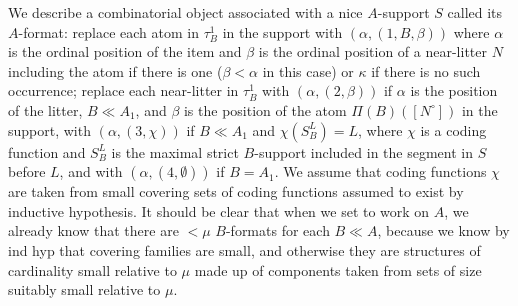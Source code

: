 \documentclass{slides}
\begin{document}
\begin{slide}

We describe a combinatorial object associated with a nice $A$-support $S$ called its $A$-format:  replace each atom in $\tau^1_B$ in the support with $(\alpha,(1,B,\beta))$ where
$\alpha$ is the ordinal position of the item and $\beta$ is the ordinal position of a near-litter $N$ including the atom if there is one ($\beta <\alpha$ in this case) or $\kappa$ if
there is no such occurrence;  replace each near-litter in $\tau^1_B$ with $(\alpha,(2,\beta))$ if $\alpha$ is the position of the litter, $B \ll A_1$, and $\beta$ is the position of the
atom $\Pi(B)([N^{\circ}])$ in the support, with $(\alpha,(3,\chi))$ if $B\ll A_1$ and $\chi(S^L_B) = L$, where $\chi$ is a coding function and $S^L_B$ is the maximal strict $B$-support
included in the segment in $S$ before $L$, and with $(\alpha,(4,\emptyset))$ if $B = A_1$.  We assume that coding functions $\chi$ are taken from small covering sets of coding
functions assumed to exist by inductive hypothesis.  It should be clear that when we set to work on $A$, we already know that there are $<\mu$ $B$-formats for each $B \ll A$, because we know by ind hyp that covering families are small, and otherwise they are structures of cardinality small relative to $\mu$ made up of components taken from sets of size suitably small relative to $\mu$.

\end{slide}
\end{document}
